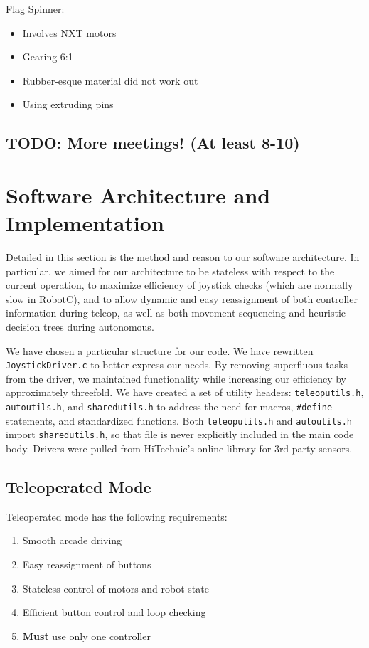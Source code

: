 \documentclass{article}
\begin{document}
Flag Spinner:
\begin{itemize}
\item Involves NXT motors
\item Gearing 6:1
\item Rubber-esque material did not work out
\item Using extruding pins
\end{itemize}

\newpage \subsection{TODO: More meetings! (At least 8-10)}

\section{Software Architecture and Implementation}
Detailed in this section is the method and reason to our software architecture. In particular, we aimed for our architecture to be stateless with respect to the current operation, to maximize efficiency of joystick checks (which are normally slow in RobotC), and to allow dynamic and easy reassignment of both controller information during teleop, as well as both movement sequencing and heuristic decision trees during autonomous.

We have chosen a particular structure for our code. We have rewritten \lstinline{JoystickDriver.c}{} to better express our needs. By removing superfluous tasks from the driver, we maintained functionality while increasing our efficiency by approximately threefold. We have created a set of utility headers: \lstinline{teleoputils.h}{}, \lstinline{autoutils.h}{}, and \lstinline{sharedutils.h}{} to address the need for macros, \lstinline{#define}{} statements, and standardized functions. Both \lstinline{teleoputils.h}{} and \lstinline{autoutils.h}{} import \lstinline{sharedutils.h}{}, so that file is never explicitly included in the main code body. Drivers were pulled from HiTechnic's online library for 3rd party sensors.

\subsection{Teleoperated Mode}

Teleoperated mode has the following requirements: \begin{enumerate}
	\item{Smooth arcade driving}
	\item{Easy reassignment of buttons}
	\item{Stateless control of motors and robot state}
	\item{Efficient button control and loop checking}
	\item{\textbf{Must} use only one controller}
\end{enumerate}
\end{document}
